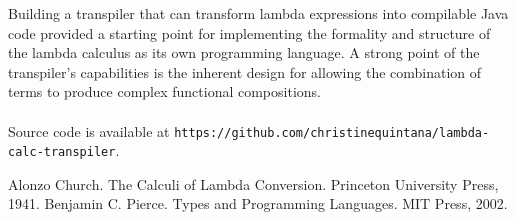 \documentclass[11pt]{article}
\begin{document}
Building a transpiler that can transform lambda expressions into compilable Java code provided a starting point for implementing the formality and structure of the lambda calculus as its own programming language. A strong point of the transpiler's capabilities is the inherent design for allowing the combination of terms to produce complex functional compositions. 
\\
\\
Source code is available at \texttt{https://github.com/christinequintana/lambda-calc-transpiler}.

\begin{thebibliography}{9}

	Alonzo Church. The Calculi of Lambda Conversion. Princeton University Press, 1941.
	Benjamin C. Pierce. Types and Programming Languages. MIT Press, 2002.

\end{thebibliography}
\end{document}
